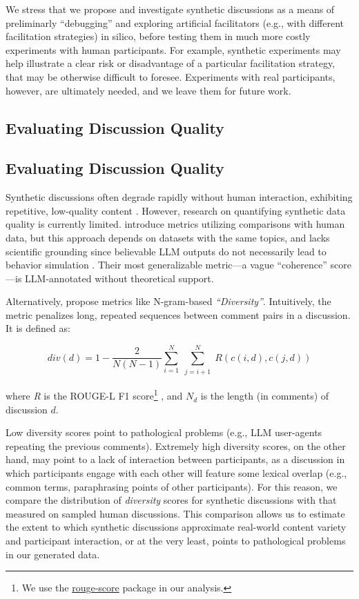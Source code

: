 We stress that we propose and investigate synthetic discussions as a means of preliminarly “debugging” and exploring artificial facilitators (e.g., with different facilitation strategies) in silico, before testing them in much more costly experiments with human participants. For example, synthetic experiments may help illustrate a clear risk or disadvantage of a particular facilitation strategy, that may be otherwise difficult to foresee. Experiments with real participants, however, are ultimately needed, and we leave them for future work.


\subsection{Evaluating Discussion Quality}
\subsection{Evaluating Discussion Quality}
\label{ssec:related:quality}

Synthetic discussions often degrade rapidly without human interaction, exhibiting repetitive, low-quality content \citep{ulmer2024}. However, research on quantifying synthetic data quality is currently limited. \citet{balog_2024} introduce metrics utilizing comparisons with human data, but this approach depends on datasets with the same topics, and lacks scientific grounding since believable \ac{LLM} outputs do not necessarily lead to behavior simulation \cite{rossi_2024}. Their most generalizable metric—a vague “coherence” score—is \ac{LLM}-annotated without theoretical support. 

Alternatively, \citet{ulmer2024} propose metrics like N-gram-based \textit{“Diversity”}. Intuitively, the metric penalizes long, repeated sequences between comment pairs in a discussion. It is defined as:

\small
\begin{equation}
\label{eq:variety}
    \textit{div}(d) = 1 - \frac{2}{N(N-1)}
\sum_{i=1}^N \sum_{\substack{j=i+1}}^N R(c(i,d), c(j,d))
\end{equation}
\normalsize

\noindent where \textit{R} is the ROUGE-L F1 score\footnote{We use the \href{https://pypi.org/project/rouge-score}{rouge-score} package in our analysis.} \cite{lin-2004-rouge}, and $N_d$ is the length (in comments) of discussion $d$.

Low diversity scores point to pathological problems (e.g., \ac{LLM} user-agents repeating the previous comments). Extremely high diversity scores, on the other hand, may point to a lack of interaction between participants, as a discussion in which participants engage with each other will feature some lexical overlap (e.g., common terms, paraphrasing points of other participants). For this reason, we compare the distribution of \textit{diversity} scores for synthetic discussions with that measured on sampled human discussions. This comparison allows us to estimate the extent to which synthetic discussions approximate real-world content variety and participant interaction, or at the very least, points to pathological problems in our generated data. 

